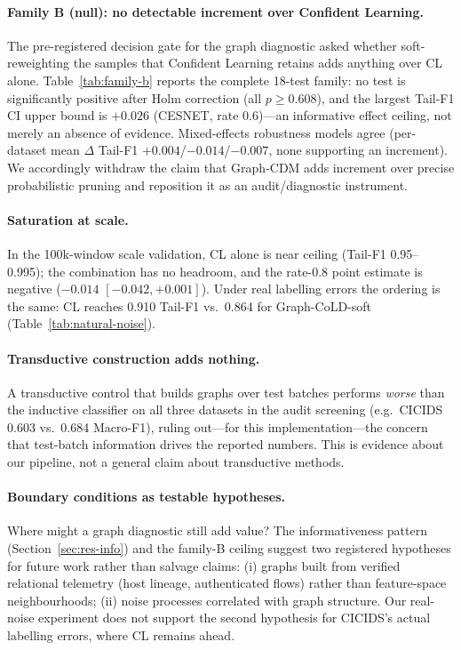 \documentclass[pdflatex,referee,lineno,sn-basic,Numbered]{sn-jnl}
\begin{document}
\paragraph{Family B (null): no detectable increment over Confident Learning.}
The pre-registered decision gate for the graph diagnostic asked whether
soft-reweighting the samples that Confident Learning retains adds anything over
CL alone. Table~\ref{tab:family-b} reports the complete 18-test family: no
test is significantly positive after Holm correction (all $p\ge0.608$), and the
largest Tail-F1 CI upper bound is $+0.026$ (CESNET, rate 0.6)---an informative
effect ceiling, not merely an absence of evidence. Mixed-effects robustness
models agree (per-dataset mean $\Delta$ Tail-F1 $+0.004$/$-0.014$/$-0.007$,
none supporting an increment). We accordingly withdraw the claim that
Graph-CDM adds increment over precise probabilistic pruning and reposition it
as an audit/diagnostic instrument.



\paragraph{Saturation at scale.}
In the 100k-window scale validation, CL alone is near ceiling (Tail-F1
0.95--0.995); the combination has no headroom, and the rate-0.8 point estimate
is negative ($-0.014$ $[-0.042, +0.001]$). Under real labelling errors the
ordering is the same: CL reaches 0.910 Tail-F1 vs.\ 0.864 for
Graph-CoLD-soft (Table~\ref{tab:natural-noise}).

\paragraph{Transductive construction adds nothing.}
A transductive control that builds graphs over test batches performs
\emph{worse} than the inductive classifier on all three datasets in the audit
screening (e.g.\ CICIDS 0.603 vs.\ 0.684 Macro-F1), ruling out---for this
implementation---the concern that test-batch information drives the reported
numbers. This is evidence about our pipeline, not a general claim about
transductive methods.

\paragraph{Boundary conditions as testable hypotheses.}
Where might a graph diagnostic still add value? The informativeness pattern
(Section~\ref{sec:res-info}) and the family-B ceiling suggest two registered
hypotheses for future work rather than salvage claims: (i) graphs built from
verified relational telemetry (host lineage, authenticated flows) rather than
feature-space neighbourhoods; (ii) noise processes correlated with graph
structure. Our real-noise experiment does not support the second hypothesis
for CICIDS's actual labelling errors, where CL remains ahead.
\end{document}

